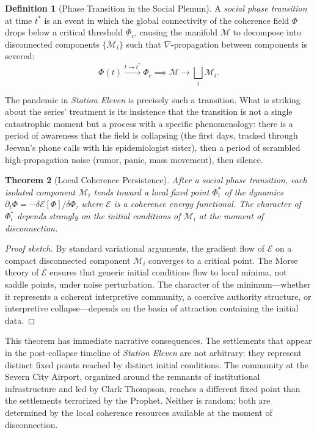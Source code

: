 \documentclass[12pt, oneside]{article}
\theoremstyle{plain}
\newtheorem{theorem}{Theorem}[section]
\theoremstyle{definition}
\newtheorem{definition}[theorem]{Definition}
\theoremstyle{remark}
\newcommand{\Field}{\Phi}
\begin{document}
\begin{definition}[Phase Transition in the Social Plenum]
A \emph{social phase transition} at time $t^*$ is an event in which
the global connectivity of the coherence field $\Field$ drops below a
critical threshold $\Field_c$, causing the manifold $\mathcal{M}$ to
decompose into disconnected components $\{\mathcal{M}_i\}$ such that
$\nabla$-propagation between components is severed:
\[
  \Field(t) \xrightarrow{t \to t^*} \Field_c
  \implies
  \mathcal{M} \longrightarrow \bigsqcup_i \mathcal{M}_i.
\]
\end{definition}

The pandemic in \textit{Station Eleven} is precisely such a
transition. What is striking about the series' treatment is its
insistence that the transition is not a single catastrophic moment
but a process with a specific phenomenology: there is a period of
awareness that the field is collapsing (the first days, tracked
through Jeevan's phone calls with his epidemiologist sister), then
a period of scrambled high-propagation noise (rumor, panic, mass
movement), then silence.

\begin{theorem}[Local Coherence Persistence]
\label{thm:local-coherence}
After a social phase transition, each isolated component
$\mathcal{M}_i$ tends toward a local fixed point $\Field_i^*$ of the
dynamics $\partial_t \Field = -\delta \mathcal{E}[\Field] / \delta
\Field$, where $\mathcal{E}$ is a coherence energy functional. The
character of $\Field_i^*$ depends strongly on the initial conditions
of $\mathcal{M}_i$ at the moment of disconnection.
\end{theorem}

\begin{proof}[Proof sketch]
By standard variational arguments, the gradient flow of $\mathcal{E}$
on a compact disconnected component $\mathcal{M}_i$ converges to a
critical point. The Morse theory of $\mathcal{E}$ ensures that
generic initial conditions flow to local minima, not saddle points,
under noise perturbation. The character of the minimum---whether it
represents a coherent interpretive community, a coercive authority
structure, or interpretive collapse---depends on the basin of
attraction containing the initial data.
\end{proof}

This theorem has immediate narrative consequences. The settlements
that appear in the post-collapse timeline of \textit{Station Eleven}
are not arbitrary: they represent distinct fixed points reached by
distinct initial conditions. The community at the Severn City Airport,
organized around the remnants of institutional infrastructure and
led by Clark Thompson, reaches a different fixed point than the
settlements terrorized by the Prophet. Neither is random; both are
determined by the local coherence resources available at the moment
of disconnection.
\end{document}
